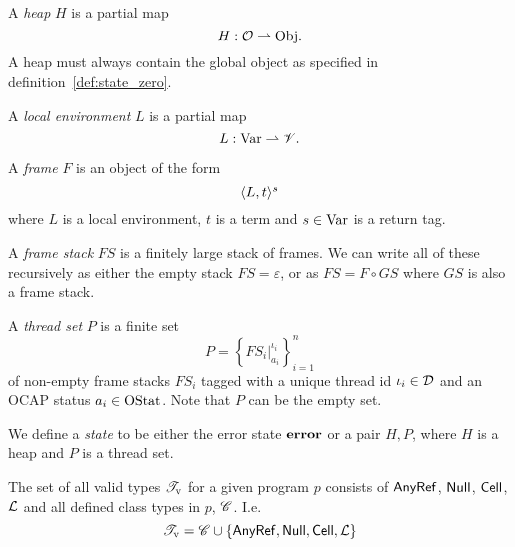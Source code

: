\begin{definition}
  A \emph{heap} $H$ is a partial map
  \begin{equation*}
    H: \mathcal{O} \rightharpoonup \mathrm{Obj}.
  \end{equation*}
  A heap must always contain the global object as specified in
  definition~\ref{def:state_zero}.
\end{definition}

\begin{definition}
  A \emph{local environment} $L$ is a partial map
  \begin{equation*}
    L: \mathrm{Var} \rightharpoonup \mathscr{V}.
  \end{equation*}
\end{definition}

\begin{definition}\label{def:thread_sets}
  A \emph{frame} $F$ is an object of the form
  \begin{equation*}
    \mbox{$\langle L, t \rangle^s$}
  \end{equation*}
  where $L$ is a local environment, $t$ is a term and $s \in \mathrm{Var}$ is a
  return tag.

  A \emph{frame stack} $FS$ is a finitely large stack of frames. We can write
  all of these recursively as either the empty stack $FS = \varepsilon$, or as
  $FS = F \circ GS$ where $GS$ is also a frame stack.

  A \emph{thread set} $P$ is a finite set 
  \begin{equation*}
    P = \left\{ FS_i|_{a_i}^{\iota_i} \right\}_{i = 1}^{n}
  \end{equation*}
  of non-empty frame stacks $FS_i$ tagged with a unique thread id $\iota_i \in \mathcal{D}$ and an
  OCAP status $a_i \in \mathrm{OStat}$. Note that $P$ can be the empty set.
\end{definition}

\begin{definition}
  We define a \emph{state} to be either the error state $\mbox{{\bf error}}$ or a pair $H,
  P$, where $H$ is a heap and $P$ is a thread set.
\end{definition}

\begin{definition}
  The set of all valid types $\mathscr{T}_{\text{v}}$ for a given program $p$ consists of
  $\mbox{$\mathsf{AnyRef}$}$, $\mbox{$\mathsf{Null}$}$, $\mbox{$\mathsf{Cell}$}$, $\mbox{$\mathcal{L}$}$ and all defined
  class types in $p$, $\mathscr{C}$. I.e.
  \begin{equation*}
    \mathscr{T}_{\text{v}} = \mathscr{C} \cup \left\{ \mbox{$\mathsf{AnyRef}$}, \mbox{$\mathsf{Null}$}, \mbox{$\mathsf{Cell}$},
    \mbox{$\mathcal{L}$} \right\}
  \end{equation*}
\end{definition}

